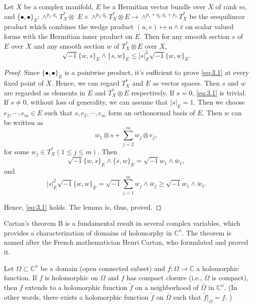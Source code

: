 \documentclass[lang=en,12pt]{beautybook}
\begin{document}
\begin{lemma}
  Let $X$ be a complex manifold, $E$ be a Hermitian vector bundle over $X$ of rank $m$, and $\{\bullet, \bullet\}_E: \wedge^{p_1, q_1} T_X^* \otimes$ $E \times \wedge^{p_2, q_2} T_X^* \otimes E \longrightarrow \wedge^{p_1+q_2, q_1+p_2} T_X^*$ be the sesquilinear product which combines the wedge product $(u, v) \mapsto u \wedge \bar{v}$ on scalar valued forms with the Hermitian inner product on $E$. Then for any smooth section $s$ of $E$ over $X$ and any smooth section $w$ of $T_X^* \otimes E$ over $X$,
\begin{equation}\label{eq:3.1}
    \sqrt{-1}\{w, s\}_E \wedge\{s, w\}_E \leq|s|_E^2 \sqrt{-1}\{w, w\}_E .
\end{equation}
\end{lemma}

\begin{proof}
  Since $\{\bullet, \bullet\}_E$ is a pointwise product, it's sufficient to prove \eqref{eq:3.1}  at every fixed point of $X$. Hence, we can regard $T_X^*$ and $E$ as vector spaces. Then $s$ and $w$ are regarded as elements in $E$ and $T_X^* \otimes E$ respectively. If $s=0$, \eqref{eq:3.1} is trivial. If $s \neq 0$, without loss of generality, we can assume that $|s|_E=1$. Then we choose $e_2, \cdots, e_m \in E$ such that $s, e_2, \cdots, e_m$ form an orthonormal basis of $E$. Then $w$ can be written as
  $$
  w_1 \otimes s+\sum_{j=2}^m w_j \otimes e_j,
  $$
  for some $w_j \in T_X^*(1 \leq j \leq m)$. Then
  $$
  \sqrt{-1}\{w, s\}_E \wedge\{s, w\}_E=\sqrt{-1} w_1 \wedge \bar{w}_1,
  $$
  and
  $$
  |s|_E^2 \sqrt{-1}\{w, w\}_E=\sqrt{-1} \sum_{j=1}^m w_j \wedge \bar{w}_j \geq \sqrt{-1} w_1 \wedge \bar{w}_1 .
  $$
  
  Hence, \eqref{eq:3.1} holds. The lemma is, thus, proved.
\end{proof}

Cartan's theorem B is a fundamental result in several complex variables, which provides a characterization of domains of holomorphy in \( \mathbb{C}^n \). The theorem is named after the French mathematician Henri Cartan, who formulated and proved it.


\begin{theorem}
  Let \( \Omega \subset \mathbb{C}^n \) be a domain (open connected subset) and \( f: \Omega \to \mathbb{C} \) a holomorphic function.
  If \( f \) is holomorphic on \( \Omega \) and \( f \) has compact closure (i.e., \( \overline{\Omega} \) is compact), then \( f \) extends to a holomorphic function $\widetilde{f}$  on a neighborhood of \( \overline{\Omega} \) in \( \mathbb{C}^n \). (In other words, there exists a holomorphic function $\widetilde{f}$ on $\overline{\Omega}$ such that $\widetilde{f}|_\Omega=f$.  ) 
\end{theorem}
\end{document}
